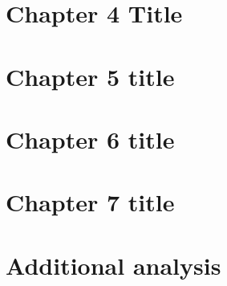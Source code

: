 \documentclass[11pt,oneside]{report} %
\begin{document}


\chapter{Chapter 4 Title}




\chapter{Chapter 5 title}



\chapter{Chapter 6 title}



\chapter{Chapter 7 title}


\appendix
\chapter{Additional analysis}



\end{document}
